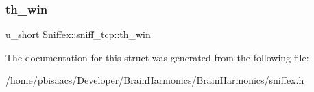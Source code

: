 \subsubsection{\texorpdfstring{th\+\_\+win}{th\_win}}
{\footnotesize\ttfamily u\+\_\+short Sniffex\+::sniff\+\_\+tcp\+::th\+\_\+win}



The documentation for this struct was generated from the following file\+:\begin{DoxyCompactItemize}
\item 
/home/pbisaacs/\+Developer/\+Brain\+Harmonics/\+Brain\+Harmonics/\mbox{\hyperlink{sniffex_8h}{sniffex.\+h}}\end{DoxyCompactItemize}
